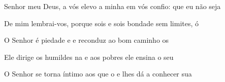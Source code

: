 \begin{greenumerate}
  \item {}Senhor meu Deus, a vós elevo a minha  em vós confio: que eu não seja 

  \item {}De mim lembrai-vos, porque sois  e sois bondade sem limites, ó 

  \item {}O Senhor é piedade e  e reconduz ao bom caminho os 

  \item {}Ele dirige os humildes na  e aos pobres ele ensina o seu 

  \item {}O Senhor se torna íntimo aos que o  e lhes dá a conhecer sua 
\end{greenumerate}